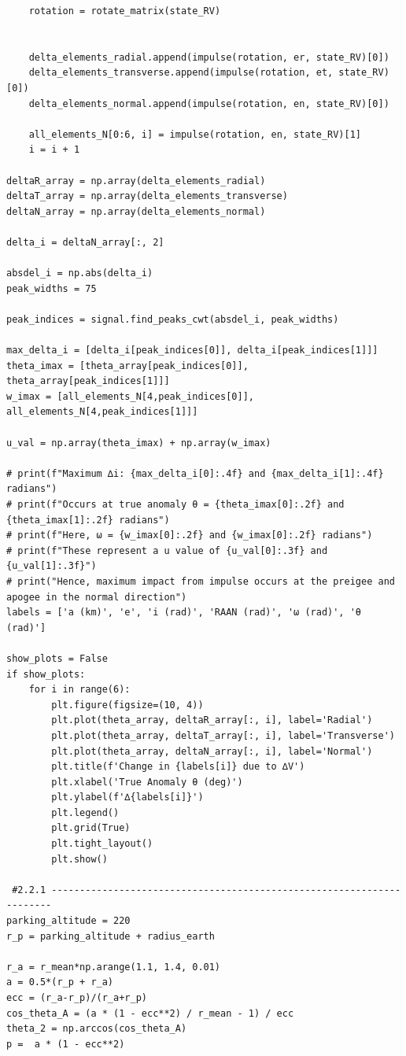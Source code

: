 \documentclass[12pt,twocolumn]{article}  %
\begin{document}
\begin{verbatim}
    rotation = rotate_matrix(state_RV)
    
    
    delta_elements_radial.append(impulse(rotation, er, state_RV)[0])
    delta_elements_transverse.append(impulse(rotation, et, state_RV)[0])
    delta_elements_normal.append(impulse(rotation, en, state_RV)[0])
    
    all_elements_N[0:6, i] = impulse(rotation, en, state_RV)[1]
    i = i + 1

deltaR_array = np.array(delta_elements_radial)
deltaT_array = np.array(delta_elements_transverse)
deltaN_array = np.array(delta_elements_normal)

delta_i = deltaN_array[:, 2]

absdel_i = np.abs(delta_i)
peak_widths = 75

peak_indices = signal.find_peaks_cwt(absdel_i, peak_widths)

max_delta_i = [delta_i[peak_indices[0]], delta_i[peak_indices[1]]]
theta_imax = [theta_array[peak_indices[0]], theta_array[peak_indices[1]]]
w_imax = [all_elements_N[4,peak_indices[0]], all_elements_N[4,peak_indices[1]]]

u_val = np.array(theta_imax) + np.array(w_imax)

# print(f"Maximum ∆i: {max_delta_i[0]:.4f} and {max_delta_i[1]:.4f} radians")
# print(f"Occurs at true anomaly θ = {theta_imax[0]:.2f} and {theta_imax[1]:.2f} radians")
# print(f"Here, ω = {w_imax[0]:.2f} and {w_imax[0]:.2f} radians")
# print(f"These represent a u value of {u_val[0]:.3f} and {u_val[1]:.3f}")
# print("Hence, maximum impact from impulse occurs at the preigee and apogee in the normal direction")
labels = ['a (km)', 'e', 'i (rad)', 'RAAN (rad)', 'ω (rad)', 'θ (rad)']

show_plots = False
if show_plots:
    for i in range(6):
        plt.figure(figsize=(10, 4))
        plt.plot(theta_array, deltaR_array[:, i], label='Radial')
        plt.plot(theta_array, deltaT_array[:, i], label='Transverse')
        plt.plot(theta_array, deltaN_array[:, i], label='Normal')
        plt.title(f'Change in {labels[i]} due to ∆V')
        plt.xlabel('True Anomaly θ (deg)')
        plt.ylabel(f'∆{labels[i]}')
        plt.legend()
        plt.grid(True)
        plt.tight_layout()
        plt.show()
            
 #2.2.1 ----------------------------------------------------------------------
parking_altitude = 220
r_p = parking_altitude + radius_earth

r_a = r_mean*np.arange(1.1, 1.4, 0.01)
a = 0.5*(r_p + r_a)
ecc = (r_a-r_p)/(r_a+r_p)
cos_theta_A = (a * (1 - ecc**2) / r_mean - 1) / ecc
theta_2 = np.arccos(cos_theta_A)
p =  a * (1 - ecc**2)


\end{verbatim}
\end{document}
